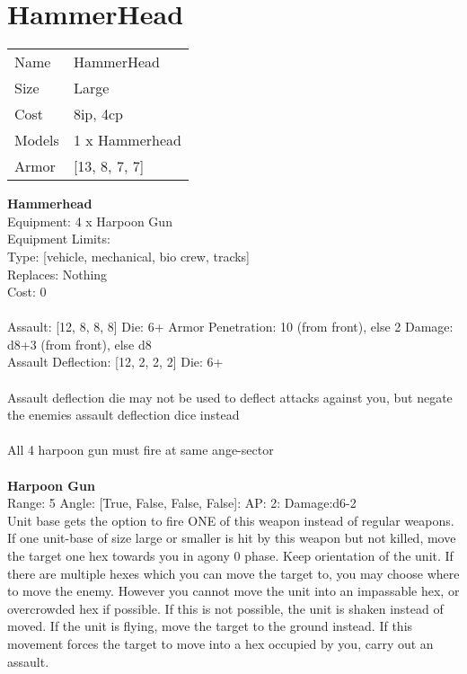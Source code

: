 \pagebreak\pagebreak

\section{ HammerHead }

\begin{tabular}{ll}
  Name & HammerHead \\
  Size & Large\\
  Cost & 8ip, 4cp\\
  Models & 1 x Hammerhead\\
  Armor & [13, 8, 7, 7]\\
\end{tabular}

\noindent 

{\bf Hammerhead } \\
Equipment: 4 x Harpoon Gun \\
Equipment Limits:  \\
Type: [vehicle, mechanical, bio crew, tracks] \\
Replaces: Nothing \\
Cost: 0\\
\ \\
Assault: [12, 8, 8, 8] Die: 6+ Armor Penetration: 10 (from front), else 2 Damage: d8+3 (from front), else d8 \\
Assault Deflection: [12, 2, 2, 2] Die: 6+\\
\\ 
Assault deflection die may not be used to deflect attacks against you, but negate the enemies assault deflection dice instead\\ 
 
\ \\
All 4 harpoon gun must fire at same ange-sector\\ 

\ \\
{\bf Harpoon Gun } \\



Range: 5  Angle: [True, False, False, False]: AP: 2: Damage:d6-2 \\
Unit base gets the option to fire ONE of this weapon instead of regular weapons.\\ 
If one unit-base of size large or smaller is hit by this weapon but not killed, move the target one hex towards you in agony 0 phase. Keep orientation of the unit. If there are multiple hexes which you can move the target to, you may choose where to move the enemy. However you cannot move the unit into an impassable hex, or overcrowded hex if possible. If this is not possible, the unit is shaken instead of moved. If the unit is flying, move the target to the ground instead. If this movement forces the target to move into a hex occupied by you, carry out an assault.\\ 




